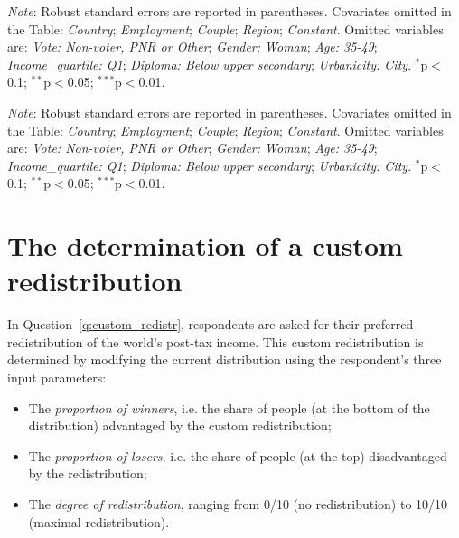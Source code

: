 \begin{table}[h]\label{tab:determinant}
    \caption[Correlates of support for global redistribution]{Correlates of support for global redistribution (multivariate OLS regressions). %
    } 
    \makebox[\textwidth][c]{
\resizebox*{!}{.73\textheight}{ %
        
        }
    }
    {\footnotesize \textit{Note}: Robust standard errors are reported in parentheses. Covariates omitted in the Table: \textit{Country}; \textit{Employment}; \textit{Couple}; \textit{Region}; \textit{Constant}. Omitted variables are: \textit{Vote: Non-voter, PNR or Other}; \textit{Gender: Woman}; \textit{Age: 35-49}; \textit{Income\_quartile: Q1}; \textit{Diploma: Below upper secondary}; \textit{Urbanicity: City}. \hfill $^{*}$p$<$0.1; $^{**}$p$<$0.05; $^{***}$p$<$0.01.
    }
\end{table}

\begin{table}[h]\label{tab:determinants_custom_redistr}
    \caption[Correlates of answers on custom redistribution]{Correlates of answers on custom redistribution (multivariate OLS regressions). %
    } 
    \makebox[\textwidth][c]{
\resizebox*{!}{.73\textheight}{ %
        
        }
    }
    {\footnotesize \textit{Note}: Robust standard errors are reported in parentheses. Covariates omitted in the Table: \textit{Country}; \textit{Employment}; \textit{Couple}; \textit{Region}; \textit{Constant}. Omitted variables are: \textit{Vote: Non-voter, PNR or Other}; \textit{Gender: Woman}; \textit{Age: 35-49}; \textit{Income\_quartile: Q1}; \textit{Diploma: Below upper secondary}; \textit{Urbanicity: City}. \hfill $^{*}$p$<$0.1; $^{**}$p$<$0.05; $^{***}$p$<$0.01.
    }
\end{table}

\clearpage
\section{The determination of a custom redistribution}\label{app:algo}

In Question~\ref{q:custom_redistr}, respondents are asked for their preferred redistribution of the world's post-tax income. This custom redistribution is determined by modifying the current distribution using the respondent's three input parameters:
\begin{itemize}
    \item The \textit{proportion of winners}, i.e. the share of people (at the bottom of the distribution) advantaged by the custom redistribution;
    \item The \textit{proportion of losers}, i.e. the share of people (at the top) disadvantaged by the redistribution;
    \item The \textit{degree of redistribution}, ranging from 0/10 (no redistribution) to 10/10 (maximal redistribution).
\end{itemize}


